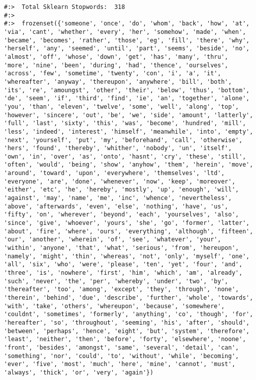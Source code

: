 \documentclass[
]{book}
\begin{document}
\begin{verbatim}
#:>  Total Sklearn Stopwords:  318 
#:> 
#:>  frozenset({'someone', 'once', 'do', 'whom', 'back', 'how', 'at', 'via', 'cant', 'whether', 'every', 'her', 'somehow', 'made', 'when', 'became', 'becomes', 'rather', 'those', 'eg', 'fill', 'there', 'why', 'herself', 'any', 'seemed', 'until', 'part', 'seems', 'beside', 'no', 'almost', 'off', 'whose', 'down', 'get', 'has', 'many', 'thru', 'more', 'nine', 'been', 'during', 'had', 'thence', 'ourselves', 'across', 'few', 'sometime', 'twenty', 'con', 'i', 'a', 'it', 'whereafter', 'anyway', 'thereupon', 'anywhere', 'bill', 'both', 'its', 're', 'amoungst', 'other', 'their', 'below', 'thus', 'bottom', 'de', 'seem', 'if', 'third', 'find', 'ie', 'an', 'together', 'alone', 'you', 'than', 'eleven', 'twelve', 'some', 'well', 'along', 'top', 'however', 'sincere', 'out', 'be', 'we', 'side', 'amount', 'latterly', 'full', 'last', 'sixty', 'this', 'was', 'become', 'hundred', 'mill', 'less', 'indeed', 'interest', 'himself', 'meanwhile', 'into', 'empty', 'next', 'yourself', 'put', 'my', 'beforehand', 'call', 'otherwise', 'hers', 'found', 'thereby', 'whither', 'nobody', 'un', 'itself', 'own', 'in', 'over', 'as', 'onto', 'hasnt', 'cry', 'these', 'still', 'often', 'would', 'being', 'show', 'anyhow', 'them', 'herein', 'move', 'around', 'toward', 'upon', 'everywhere', 'themselves', 'ltd', 'everyone', 'are', 'done', 'whenever', 'now', 'keep', 'moreover', 'either', 'etc', 'he', 'hereby', 'mostly', 'up', 'enough', 'will', 'against', 'may', 'name', 'me', 'inc', 'whence', 'nevertheless', 'above', 'afterwards', 'even', 'else', 'nothing', 'have', 'us', 'fifty', 'on', 'wherever', 'beyond', 'each', 'yourselves', 'also', 'since', 'give', 'whoever', 'yours', 'she', 'go', 'former', 'latter', 'about', 'fire', 'where', 'ours', 'everything', 'although', 'fifteen', 'our', 'another', 'wherein', 'of', 'see', 'whatever', 'your', 'within', 'anyone', 'that', 'what', 'serious', 'from', 'hereupon', 'namely', 'might', 'thin', 'whereas', 'not', 'only', 'myself', 'one', 'all', 'six', 'who', 'were', 'please', 'ten', 'yet', 'four', 'and', 'three', 'is', 'nowhere', 'first', 'him', 'which', 'am', 'already', 'such', 'never', 'the', 'per', 'whereby', 'under', 'two', 'by', 'thereafter', 'too', 'among', 'except', 'they', 'through', 'none', 'therein', 'behind', 'due', 'describe', 'further', 'whole', 'towards', 'with', 'take', 'others', 'whereupon', 'because', 'somewhere', 'couldnt', 'sometimes', 'formerly', 'anything', 'co', 'though', 'for', 'hereafter', 'so', 'throughout', 'seeming', 'his', 'after', 'should', 'between', 'perhaps', 'hence', 'eight', 'but', 'system', 'therefore', 'least', 'neither', 'then', 'before', 'forty', 'elsewhere', 'noone', 'front', 'besides', 'amongst', 'same', 'several', 'detail', 'can', 'something', 'nor', 'could', 'to', 'without', 'while', 'becoming', 'ever', 'five', 'most', 'much', 'here', 'mine', 'cannot', 'must', 'always', 'thick', 'or', 'very', 'again'})
\end{verbatim}
\end{document}
